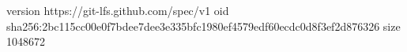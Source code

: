 version https://git-lfs.github.com/spec/v1
oid sha256:2bc115cc00e0f7bdee7dee3e335bfc1980ef4579edf60ecdc0d8f3ef2d876326
size 1048672
